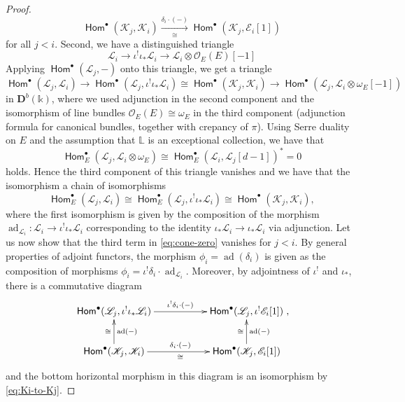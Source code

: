 \documentclass[a4paper,11pt, reqno]{amsart}
\def\L{\mathbb L}
\def\DD{\mathbf D}
\def\OO{\mathcal O}
\def\sE{\mathscr{E}}
\def\sK{\mathscr{K}}
\def\sL{\mathscr{L}}
\def\ad{{\operatorname{ad}}}
\newcommand{\opname}[1]{\operatorname{\mathsf{#1}}}
\newcommand{\Hom}{\opname{Hom}}
\def\Db{\DD^b}
\theoremstyle{plain}
\theoremstyle{definition}
\numberwithin{equation}{section}
\newlength{\arrow}
\begin{document}
\begin{proof}
\begin{equation}\label{eq:Ki-to-Kj}
    \Hom^\bullet ( \sK_j , \sK_i  ) \xrightarrow[\cong]{ \delta_i \cdot (-)} \Hom^\bullet ( \sK_j  ,  \sE_i [1] )
\end{equation} 
for all $j<i$.
Second,
we have a distinguished triangle 
\[
\sL_i \to \iota^! \iota_\ast \sL_i \to \sL_i \otimes \OO_E (E) [-1] 
\]
Applying $\Hom^\bullet ( \sL_j , - )$ onto this triangle, we get a triangle 
\[
\Hom^\bullet ( \sL_j , \sL_i ) \to \Hom^\bullet ( \sL_j , \iota^! \iota_\ast \sL_i ) \cong \Hom^\bullet ( \sK_j , \sK_i  ) \to \Hom^\bullet ( \sL_j , \sL_i \otimes \omega_E [-1] )
\]
in $\Db(\mathbb{k})$, where we used adjunction in the second component and the isomorphism of line bundles $\OO_E(E) \cong \omega_E$ in the third component (adjunction formula for canonical bundles, together with crepancy of $\pi$).
Using Serre duality on $E$ and the assumption that $\L$ is an exceptional collection, we have that
\[
 \Hom^\bullet_E ( \sL_j , \sL_i \otimes \omega_E ) \cong \Hom^\bullet_E ( \sL_i , \sL_j [d-1] )^\ast = 0 
\]
holds. 
Hence the third component of this triangle vanishes and we have that the isomorphism a chain of isomorphisms
\begin{equation}\label{eq:K-L-iso}
    \Hom^\bullet_E ( \sL_j ,  \sL_i ) \cong \Hom^\bullet_E (  \sL_j , \iota^! \iota_\ast \sL_i ) \cong \Hom^\bullet ( \sK_j , \sK_i  ) ,
\end{equation}
 where the first isomorphism is given by the composition of the morphism $\ad_{\sL_i} \colon \sL_i \to  \iota^! \iota_\ast\sL_i$ corresponding to  the identity $\iota_\ast \sL_i \to \iota_\ast \sL_i$ via adjunction.
Let us now show that the third term in \eqref{eq:cone-zero} vanishes for $j<i$.
By general properties of adjoint functors, the morphism $\phi_i = \ad (\delta_i )  $  is given as the composition of morphisms $\phi_ i = \iota^! \delta_i \cdot \ad_{\sL_i } $.  
Moreover, by adjointness of $\iota^!$ and $\iota_\ast$, there is a commutative diagram
\begin{equation}
\xymatrix{
    \Hom^\bullet (  \sL_j , \iota^! \iota_\ast \sL_i ) \ar@{<-}[d]^{\ad(-)}_\cong \ar@{->}[rr]^{ \iota^! \delta_i \cdot (-) } & & \Hom^\bullet ( \sL_j , \iota^! \sE_i [1] ) \ar@{<-}[d]^{\ad(-)}_{\cong} \\
 \Hom^\bullet ( \sK_j , \sK_i ) \ar@{->}[rr]^{\delta_i \cdot (-)}_{\cong} & & \Hom^\bullet ( \sK_j , \sE_i [1] )},
\end{equation}
and  the bottom horizontal morphism in this diagram is an isomorphism by \eqref{eq:Ki-to-Kj}.

\end{proof}
\end{document}
